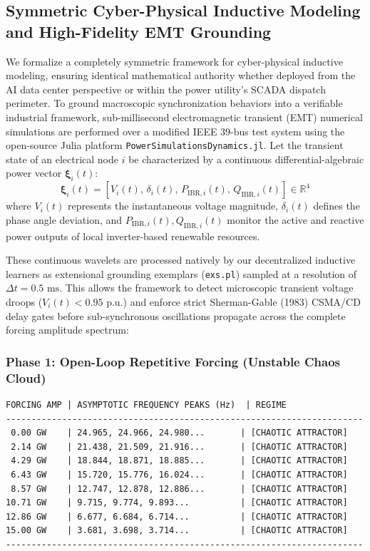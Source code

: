 \documentclass[11pt,fleqn]{article}
\begin{document}
\subsection{Symmetric Cyber-Physical Inductive Modeling and High-Fidelity EMT Grounding}
We formalize a completely symmetric framework for cyber-physical inductive modeling, ensuring identical mathematical authority whether deployed from the AI data center perspective or within the power utility's SCADA dispatch perimeter. To ground macroscopic synchronization behaviors into a verifiable industrial framework, sub-millisecond electromagnetic transient (EMT) numerical simulations are performed over a modified IEEE 39-bus test system using the open-source Julia platform \texttt{PowerSimulationsDynamics.jl}. Let the transient state of an electrical node $i$ be characterized by a continuous differential-algebraic power vector $\bm{\xi}_i(t)$:
\begin{equation}
\bm{\xi}_i(t) = \left[ V_i(t), \, \delta_i(t), \, P_{\text{IBR}, i}(t), \, Q_{\text{IBR}, i}(t) \right] \in \mathbb{R}^4
\end{equation}
where $V_i(t)$ represents the instantaneous voltage magnitude, $\delta_i(t)$ defines the phase angle deviation, and $P_{\text{IBR}, i}(t), Q_{\text{IBR}, i}(t)$ monitor the active and reactive power outputs of local inverter-based renewable resources.

These continuous wavelets are processed natively by our decentralized inductive learners as extensional grounding exemplars (\texttt{exs.pl}) sampled at a resolution of $\Delta t = 0.5\text{ ms}$. This allows the framework to detect microscopic transient voltage droops ($V_i(t) < 0.95\text{ p.u.}$) and enforce strict Sherman-Gable (1983) CSMA/CD delay gates before sub-synchronous oscillations propagate across the complete forcing amplitude spectrum:

\subsubsection{Phase 1: Open-Loop Repetitive Forcing (Unstable Chaos Cloud)}
\begin{verbatim}
FORCING AMP | ASYMPTOTIC FREQUENCY PEAKS (Hz)  | REGIME
----------------------------------------------------------------------
 0.00 GW    | 24.965, 24.966, 24.980...       | [CHAOTIC ATTRACTOR]
 2.14 GW    | 21.438, 21.509, 21.916...       | [CHAOTIC ATTRACTOR]
 4.29 GW    | 18.844, 18.871, 18.885...       | [CHAOTIC ATTRACTOR]
 6.43 GW    | 15.720, 15.776, 16.024...       | [CHAOTIC ATTRACTOR]
 8.57 GW    | 12.747, 12.878, 12.886...       | [CHAOTIC ATTRACTOR]
10.71 GW    | 9.715, 9.774, 9.893...          | [CHAOTIC ATTRACTOR]
12.86 GW    | 6.677, 6.684, 6.714...          | [CHAOTIC ATTRACTOR]
15.00 GW    | 3.681, 3.698, 3.714...          | [CHAOTIC ATTRACTOR]
----------------------------------------------------------------------
\end{verbatim}
\end{document}
